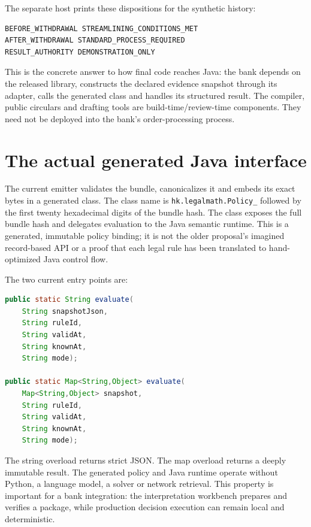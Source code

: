 \documentclass[12pt,a4paper,oneside,openany]{book}
\begin{document}
The separate host prints these dispositions for the synthetic history:
\begin{lstlisting}
BEFORE_WITHDRAWAL STREAMLINING_CONDITIONS_MET
AFTER_WITHDRAWAL STANDARD_PROCESS_REQUIRED
RESULT_AUTHORITY DEMONSTRATION_ONLY
\end{lstlisting}
This is the concrete answer to how final code reaches Java: the bank depends on
the released library, constructs the declared evidence snapshot through its
adapter, calls the generated class and handles its structured result. The
compiler, public circulars and drafting tools are build-time/review-time
components. They need not be deployed into the bank's order-processing process.

\section{The actual generated Java interface}
\label{merge:M07:09}


The current emitter validates the bundle, canonicalizes it and embeds its exact
bytes in a generated class. The class name is
\texttt{hk.legalmath.Policy\_} followed by the first twenty hexadecimal digits of
the bundle hash. The class exposes the full bundle hash and delegates evaluation
to the Java semantic runtime. This is a generated, immutable policy binding; it
is not the older proposal's imagined record-based API or a proof that each legal
rule has been translated to hand-optimized Java control flow.

The two current entry points are:
\begin{lstlisting}[language=Java,caption={Implemented generated-policy API.}]
public static String evaluate(
    String snapshotJson,
    String ruleId,
    String validAt,
    String knownAt,
    String mode);

public static Map<String,Object> evaluate(
    Map<String,Object> snapshot,
    String ruleId,
    String validAt,
    String knownAt,
    String mode);
\end{lstlisting}

The string overload returns strict JSON. The map overload returns a deeply
immutable result. The generated policy and Java runtime operate without Python,
a language model, a solver or network retrieval. This property is important for
a bank integration: the interpretation workbench prepares and verifies a package,
while production decision execution can remain local and deterministic.
\end{document}
